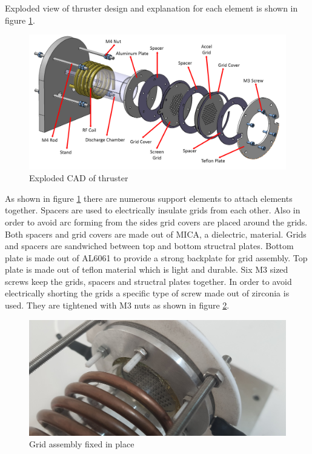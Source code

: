\newpage

Exploded view of thruster design and explanation for each element is shown in figure \ref{fig:thrusterassmexp}. 

\begin{figure}[ht]
    \centering
    \includegraphics[width=\linewidth]{fig/assm/assm_exploded_ps.png}
    \caption{Exploded CAD of thruster}
    \label{fig:thrusterassmexp}
\end{figure}



As shown in figure \ref{fig:thrusterassmexp} there are numerous support elements to attach elements together. 
Spacers are used to electrically insulate grids from each other. Also in order to avoid arc forming from the sides grid covers are placed around the grids. Both spacers and
grid covers are made out of MICA, a dielectric, material. Grids and spacers are sandwiched between top and bottom structral plates. Bottom plate is made out of AL6061 to provide a strong backplate for grid assembly. Top plate is made out of teflon material which is light and durable. Six M3 sized screws keep the grids, spacers and structral plates together. In order to avoid electrically shorting the grids a specific type of screw made out of zirconia is used. They are tightened with M3 nuts as shown in figure \ref{fig:screwsreal}. 


\begin{figure}[ht]
    \centering
    \includegraphics[width=\linewidth]{fig/assm/real_screws.jpg}
    \caption{Grid assembly fixed in place}
    \label{fig:screwsreal}
\end{figure}

